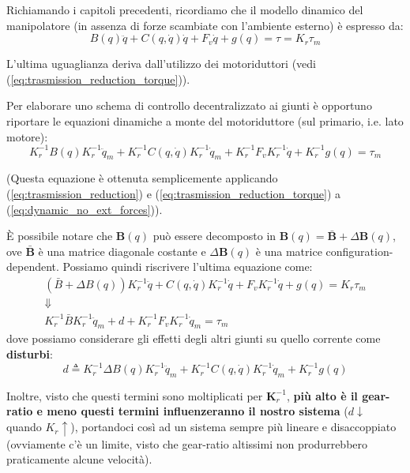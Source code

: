Richiamando i capitoli precedenti, ricordiamo che il modello dinamico del manipolatore (in assenza di forze scambiate con l’ambiente esterno) è espresso da:
\boldmath
\begin{equation}\label{eq:dynamic_no_ext_forces}
B(q)\ddot{q} + C(q, \dot{q})\dot{q} + F_v\dot{q} + g(q) = \tau = K_r \tau_m
\end{equation}
\unboldmath

L'ultima uguaglianza deriva dall'utilizzo dei motoriduttori (vedi (\ref{eq:trasmission_reduction_torque})).

Per elaborare uno schema di controllo decentralizzato ai giunti è opportuno riportare le equazioni dinamiche a monte del motoriduttore (sul primario, i.e. lato motore):
\boldmath
$$
K_r^{-1}B(q)K_r^{-1}\ddot{q}_m + K_r^{-1}C(q, \dot{q})K_r^{-1}\dot{q}_m + K_r^{-1}F_vK_r^{-1}\dot{q} + K_r^{-1}g(q) = \tau_m
$$
\unboldmath

(Questa equazione è ottenuta semplicemente applicando (\ref{eq:trasmission_reduction}) e (\ref{eq:trasmission_reduction_torque}) a (\ref{eq:dynamic_no_ext_forces})).

È possibile notare che $\mathbf{B}(q)$ può essere decomposto in $\mathbf{B}(q) = \bar{\mathbf{B}} + \Delta\mathbf{B}(q)$, ove $\bar{\mathbf{B}}$ è una matrice diagonale costante e $\Delta\mathbf{B}(q)$ è una matrice configuration-dependent. Possiamo quindi riscrivere l'ultima equazione come:
\boldmath
\begin{gather*}
(\bar{B} + \Delta B(q)) K_r^{-1} \ddot{q} + C(q, \dot{q})K_r^{-1}\dot{q} + F_vK_r^{-1}\dot{q} + g(q) = K_r \tau_m \\
\Downarrow \\
K_r^{-1}\bar{B}K_r^{-1}\ddot{q}_m + d + K_r^{-1}F_vK_r^{-1}\dot{q}_m  = \tau_m
\end{gather*}
dove possiamo considerare gli effetti degli altri giunti su quello corrente come \textbf{disturbi}:
\begin{equation}\label{eq:dynamic_disturbances}
	d \triangleq K_r^{-1}\Delta B(q)K_r^{-1}\ddot{q}_m + K_r^{-1}C(q, \dot{q})K_r^{-1}\dot{q}_m + K_r^{-1}g(q)
\end{equation}

Inoltre, visto che questi termini sono moltiplicati per $\mathbf{K}_r^{-1}$, \textbf{più alto è il gear-ratio e meno questi termini influenzeranno il nostro sistema} ($d \downarrow$ quando $K_r \uparrow$), portandoci così ad un sistema sempre più lineare e disaccoppiato (ovviamente c'è un limite, visto che gear-ratio altissimi non produrrebbero praticamente alcune velocità).

